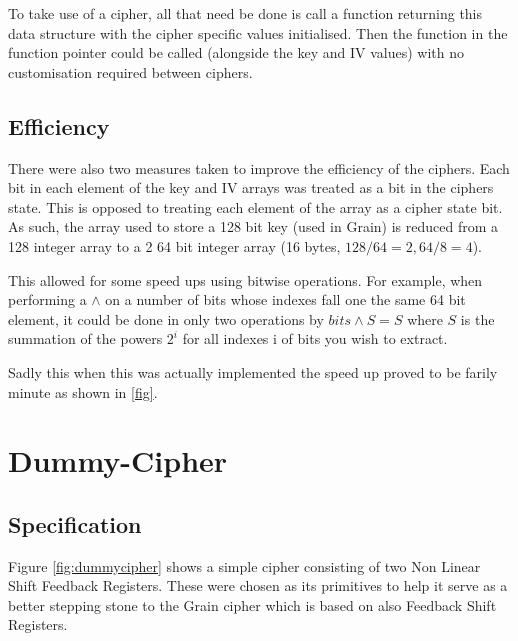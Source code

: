 \documentclass{report}
\let\Oldsection\section
\renewcommand{\section}{\FloatBarrier\Oldsection}
\let\Oldsubsection\subsection
\renewcommand{\subsection}{\FloatBarrier\Oldsubsection}
\begin{document}
To take use of a cipher, all that need be done is call a function returning this data structure with the cipher specific values initialised. Then the function in the function pointer could be called (alongside the key and IV values) with no customisation required between ciphers.

\subsection{Efficiency}

There were also two measures taken to improve the efficiency of the ciphers. Each bit in each element of the key and IV arrays was treated as a bit in the ciphers state. This is opposed to treating each element of the array as a cipher state bit. As such, the array used to store a 128 bit key (used in Grain) is reduced from a 128 integer array to a 2 64 bit integer array (16 bytes, $128/64 = 2, 64/8=4$).

\begin{figure}[!htb]
\end{figure}

This allowed for some speed ups using bitwise operations. For example, when performing a $\land$ on a number of bits whose indexes fall one the same 64 bit element, it could be done in only two operations by $bits \land S = S$ where $S$ is the summation of the powers $2^i$ for all indexes i of bits you wish to extract.

Sadly this when this was actually implemented the speed up proved to be farily minute as shown in \ref{fig}.

\newpage
\section{Dummy-Cipher}
\begin{figure}[!htb]
\end{figure}
\subsection{Specification}
Figure \ref{fig:dummycipher} shows a simple cipher consisting of two Non Linear Shift Feedback Registers. These were chosen as its primitives to help it serve as a better stepping stone to the Grain cipher which is based on also Feedback Shift Registers.
\end{document}
